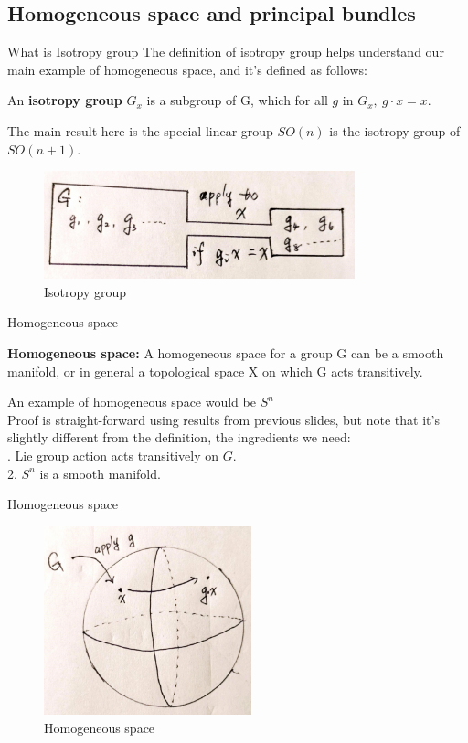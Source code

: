 \documentclass[smaller,xcolor=dvipsnames]{beamer}
\begin{document}
\subsection{Homogeneous space and principal bundles}
\begin{frame}{What is Isotropy group}
    The definition of isotropy group helps understand our main example of homogeneous space, and it's defined as follows:
\pause
    \begin{definition}
    An \textbf{isotropy group} $G_{x}$ is a subgroup of G, which for all $g$ in $G_{x},\ g\cdot x=x$.
    \end{definition}
\pause
    The main result here is the special linear group $SO(n)$ is the isotropy group of $SO(n+1)$.
\begin{figure}[tb]
\centering
\includegraphics[width=90mm]{iso.png} 
\caption{Isotropy group}
\end{figure}
\end{frame}

\begin{frame}{Homogeneous space}
    \begin{definition}
    \textbf{Homogeneous space:} A homogeneous space for a group G can be a smooth manifold, or in general a topological space X on which G acts transitively.
    \end{definition}
\pause
    An example of homogeneous space would be $S^{n}$\\
\pause
    Proof is straight-forward using results from previous slides, but note that it's slightly different from the definition, the ingredients we need:\\
. Lie group action acts transitively on $G$.\\
    2. $S^{n}$ is a smooth manifold.
    
\end{frame}

\begin{frame}{Homogeneous space}
\begin{figure}[tb]
\centering
\includegraphics[width=60mm]{homo.png} 
\caption{Homogeneous space}
\end{figure}
\end{frame}
\end{document}
